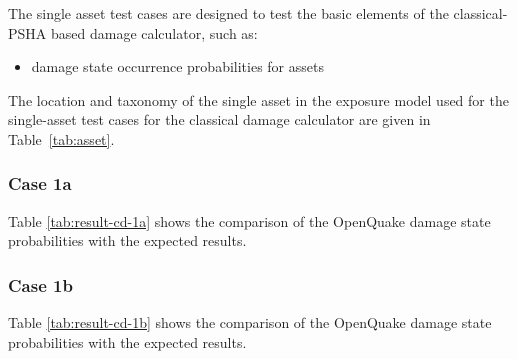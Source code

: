The single asset test cases are designed to test the basic elements of the classical-PSHA based damage calculator, such as:

\begin{itemize}
\item damage state occurrence probabilities for assets
\end{itemize}

The location and taxonomy of the single asset in the exposure model used for the single-asset test cases for the classical damage calculator are given in Table~\ref{tab:asset}.


\subsubsection{Case 1a}



Table \ref{tab:result-cd-1a} shows the comparison of the OpenQuake damage state probabilities with the expected results.

\subsubsection{Case 1b}



Table \ref{tab:result-cd-1b} shows the comparison of the OpenQuake damage state probabilities with the expected results.

